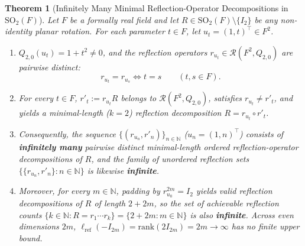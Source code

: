 \documentclass[11pt,a4paper]{article}
\theoremstyle{plain}
\newtheorem{theorem}{Theorem}[section]
\theoremstyle{definition}
\newcommand{\N}{\mathbb{N}}
\newcommand{\SO}{\mathrm{SO}}
\newcommand{\Refl}{\mathcal{R}}
\newcommand{\lref}{\ell_{\mathrm{ref}}}
\newcommand{\rk}{\mathrm{rank}}
\begin{document}
\begin{theorem}[Infinitely Many Minimal Reflection-Operator Decompositions in $\SO_2(F)$]
\label{thm:inf-counting}
Let $F$ be a formally real field and let $R \in \SO_2(F) \setminus \{I_2\}$ be any non-identity planar rotation. For each parameter $t \in F$, let $u_t = (1, t)^\top \in F^2$.
\begin{enumerate}
\item $Q_{2,0}(u_t) = 1 + t^2 \neq 0$, and the reflection operators $r_{u_t} \in \Refl(F^2, Q_{2,0})$ are pairwise distinct:
\begin{equation}\label{eq:op-inj}
  r_{u_t} = r_{u_s} \iff t = s \qquad (t, s \in F).
\end{equation}
\item For every $t \in F$, $r'_t := r_{u_t} R$ belongs to $\Refl(F^2, Q_{2,0})$, satisfies $r_{u_t} \neq r'_t$, and yields a minimal-length ($k = 2$) reflection decomposition $R = r_{u_t} \circ r'_t$.
\item Consequently, the sequence $\{(r_{u_n}, r'_n)\}_{n \in \N}$ ($u_n = (1, n)^\top$) consists of \textbf{infinitely many} pairwise distinct minimal-length ordered reflection-operator decompositions of $R$, and the family of unordered reflection sets $\{\{r_{u_n}, r'_n\} : n \in \N\}$ is likewise \textbf{infinite}.
\item Moreover, for every $m \in \N$, padding by $r_{u_0}^{2m} = I_2$ yields valid reflection decompositions of $R$ of length $2 + 2m$, so the set of achievable reflection counts $\{k \in \N : R = r_1 \cdots r_k\} = \{2 + 2m : m \in \N\}$ is also \textbf{infinite}. Across even dimensions $2m$, $\lref(-I_{2m}) = \rk(2 I_{2m}) = 2m \to \infty$ has no finite upper bound.
\end{enumerate}
\end{theorem}
\end{document}
